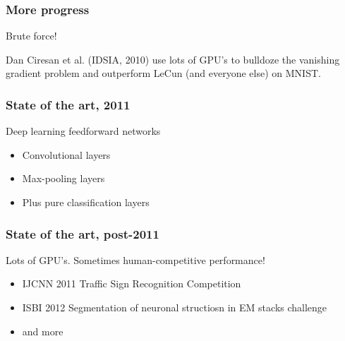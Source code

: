 \begin{frame}
  \frametitle{More progress}
  Brute force!

  Dan Ciresan et al. (IDSIA, 2010) use lots of GPU's to
  bulldoze the vanishing gradient problem and outperform LeCun (and
  everyone else) on MNIST.

\end{frame}

\begin{frame}
  \frametitle{State of the art, 2011}

  Deep learning feedforward networks
  \begin{itemize}
  \item Convolutional layers
  \item Max-pooling layers
  \item Plus pure classification layers
  \end{itemize}


\end{frame}

\begin{frame}
  \frametitle{State of the art, post-2011}
  
  Lots of GPU's.  Sometimes human-competitive performance!
  \begin{itemize}
  \item IJCNN 2011 Traffic Sign Recognition Competition
  \item ISBI 2012 Segmentation of neuronal structiosn in EM stacks challenge
  \item and more
  \end{itemize}

\end{frame}

